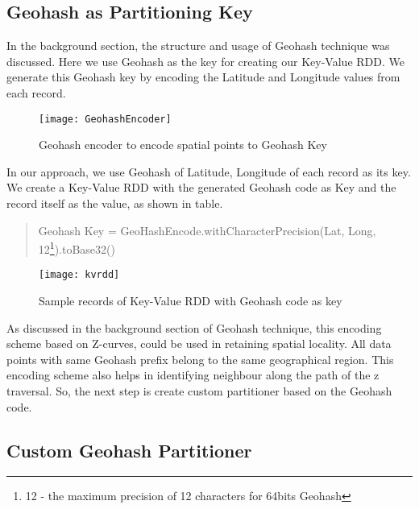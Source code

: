 \documentclass[article,type=msc,colorback,12pt,accentcolor=tud1d]{tudthesis}
\begin{document}
		\subsection{Geohash as Partitioning Key}
			\par In the background section, the structure and usage of Geohash technique was discussed. Here we use Geohash as the key for creating our Key-Value RDD. We generate this Geohash key by encoding the Latitude and Longitude values from each record. \\
						
				\begin{figure}[h]
					\centering
					\texttt{[image: GeohashEncoder]}
					\caption{Geohash encoder to encode spatial points to Geohash Key}
					\label{fig:GeohashEncoder}
				\end{figure}
		In our approach, we use Geohash of Latitude, Longitude of each record as its key. We create a Key-Value RDD with the generated Geohash code as Key and the record itself as the value, as shown in table. 
		\begin{quote}
			Geohash Key = GeoHashEncode.withCharacterPrecision(Lat, Long, 12\footnote{12 - the  maximum precision of 12 characters for 64bits Geohash}).toBase32()
		\end{quote}
				\begin{figure}[h]
					\centering
					\texttt{[image: kvrdd]}
					\caption{Sample records of Key-Value RDD with Geohash code as key}
					\label{fig:kvrdd}
				\end{figure}
				
				As discussed in the background section of Geohash technique, this encoding scheme based on Z-curves, could be used in retaining spatial locality. All data points with same Geohash prefix belong to the same geographical region. This encoding scheme also helps in identifying neighbour along the path of the z traversal. So, the next step is create custom partitioner based on the Geohash code.

		
		\subsection{Custom Geohash Partitioner}
				
\end{document}
